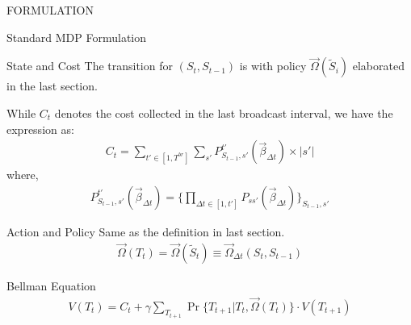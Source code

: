 \documentclass[10pt, conference, letterpaper]{IEEEtran}
\begin{document}
\begin{section}{FORMULATION}
\begin{subsection}{Standard MDP Formulation}
\begin{subsubsection}{State and Cost}
                The transition for $(S_{t}, S_{t-1})$ is with policy $\vec{\Omega}(\tilde{S}_i)$ elaborated in the last section.
                
                While $C_t$ denotes the cost collected in the last broadcast interval, we have the expression as:
                \begin{align}
                    C_t = \sum_{t'\in[1,T^{br}]} \sum_{s'} P_{S_{t-1},s'}^{t'}(\vec{\beta}_{\Delta{t}}) \times |s'|
                \end{align}
                where,
                \begin{align}
                    P_{S_{t-1},s'}^{t'}(\vec{\beta}_{\Delta{t}})
                    = \{
                        \prod_{\Delta{t} \in [1,t']} P_{ss'}(\vec{\beta}_{\Delta{t}})
                    \}_{S_{t-1}, s'}
                \end{align}
            \end{subsubsection}

            \begin{subsubsection}{Action and Policy}
                Same as the definition in last section.
                \begin{align}
                    \vec{\Omega}(T_t) = \vec{\Omega}(\tilde{S}_t) \equiv \vec{\Omega}_{\Delta{t}}(S_t, S_{t-1})
                \end{align}
            \end{subsubsection}

            \begin{subsubsection}{Bellman Equation}
                \begin{align}
                    V(T_{t}) = C_t + \gamma \sum_{T_{t+1}} \Pr\{T_{t+1}|T_{t}, \vec{\Omega}(T_t)\} \cdot V(T_{t+1})
                \end{align}
            \end{subsubsection}
        \end{subsection}


\end{section}
\end{document}
